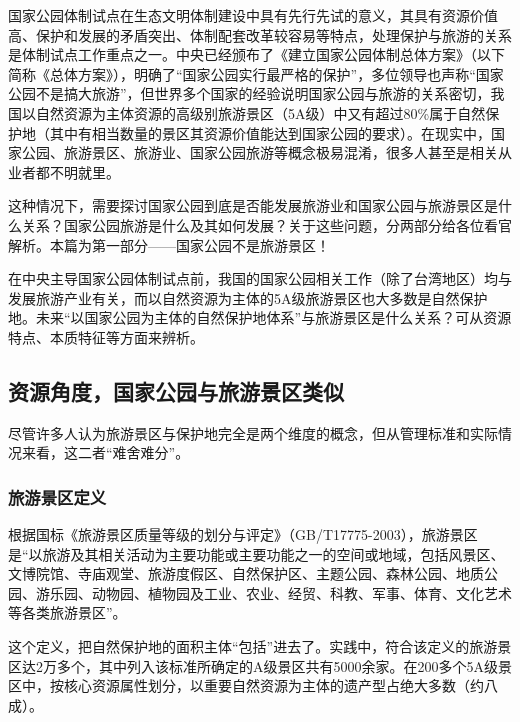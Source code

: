 \documentclass[]{book}
\begin{document}
国家公园体制试点在生态文明体制建设中具有先行先试的意义，其具有资源价值高、保护和发展的矛盾突出、体制配套改革较容易等特点，处理保护与旅游的关系是体制试点工作重点之一。中央已经颁布了《建立国家公园体制总体方案》（以下简称《总体方案》），明确了``国家公园实行最严格的保护''，多位领导也声称``国家公园不是搞大旅游''，但世界多个国家的经验说明国家公园与旅游的关系密切，我国以自然资源为主体资源的高级别旅游景区（5A级）中又有超过80\%属于自然保护地（其中有相当数量的景区其资源价值能达到国家公园的要求）。在现实中，国家公园、旅游景区、旅游业、国家公园旅游等概念极易混淆，很多人甚至是相关从业者都不明就里。

这种情况下，需要探讨国家公园到底是否能发展旅游业和国家公园与旅游景区是什么关系？国家公园旅游是什么及其如何发展？关于这些问题，分两部分给各位看官解析。本篇为第一部分------国家公园不是旅游景区！

在中央主导国家公园体制试点前，我国的国家公园相关工作（除了台湾地区）均与发展旅游产业有关，而以自然资源为主体的5A级旅游景区也大多数是自然保护地。未来``以国家公园为主体的自然保护地体系''与旅游景区是什么关系？可从资源特点、本质特征等方面来辨析。

\hypertarget{ux8d44ux6e90ux89d2ux5ea6ux56fdux5bb6ux516cux56edux4e0eux65c5ux6e38ux666fux533aux7c7bux4f3c}{%
\subsection{资源角度，国家公园与旅游景区类似}\label{ux8d44ux6e90ux89d2ux5ea6ux56fdux5bb6ux516cux56edux4e0eux65c5ux6e38ux666fux533aux7c7bux4f3c}}

尽管许多人认为旅游景区与保护地完全是两个维度的概念，但从管理标准和实际情况来看，这二者``难舍难分''。

\hypertarget{ux65c5ux6e38ux666fux533aux5b9aux4e49}{%
\subsubsection{旅游景区定义}\label{ux65c5ux6e38ux666fux533aux5b9aux4e49}}

根据国标《旅游景区质量等级的划分与评定》（GB/T17775-2003），旅游景区是``以旅游及其相关活动为主要功能或主要功能之一的空间或地域，包括风景区、文博院馆、寺庙观堂、旅游度假区、自然保护区、主题公园、森林公园、地质公园、游乐园、动物园、植物园及工业、农业、经贸、科教、军事、体育、文化艺术等各类旅游景区''。

这个定义，把自然保护地的面积主体``包括''进去了。实践中，符合该定义的旅游景区达2万多个，其中列入该标准所确定的A级景区共有5000余家。在200多个5A级景区中，按核心资源属性划分，以重要自然资源为主体的遗产型占绝大多数（约八成）。
\end{document}
